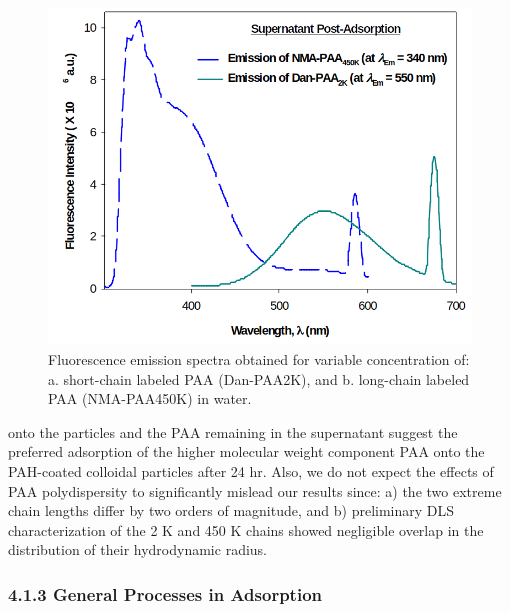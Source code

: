 \documentclass[journal=jacsat,manuscript=article]{achemso}
\begin{document}
\begin{figure}[H]
\includegraphics[scale=1.75]{fig6.png}
\caption{Fluorescence emission spectra obtained for variable concentration of: a. short-chain labeled PAA (Dan-PAA2K), and b. long-chain labeled PAA (NMA-PAA450K) in water.}
\label{figure 6}
\end{figure}


onto the particles and the PAA remaining in the supernatant suggest the preferred adsorption of the higher molecular weight component PAA onto the PAH-coated colloidal particles after 24 hr.  Also, we do not expect the effects of PAA polydispersity to significantly mislead our results since: a) the two extreme chain lengths differ by two orders of magnitude, and b) preliminary DLS characterization of the 2 K and 450 K chains showed negligible overlap in the distribution of their hydrodynamic radius.

\subsubsection{4.1.3 General Processes in Adsorption}
\end{document}
